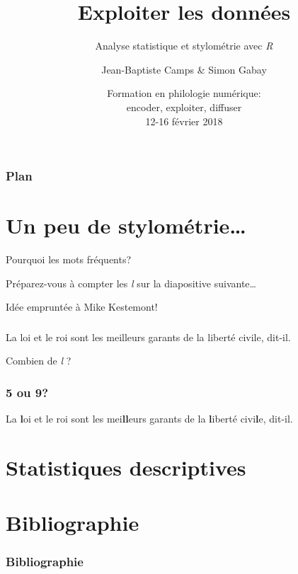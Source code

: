\documentclass{beamer}
\institute{Univ. de Neuchâtel}
\title{Exploiter les données}
\subtitle{Analyse statistique et stylométrie avec \textit{R}}
\author{Jean-Baptiste Camps \& Simon Gabay}
\date[FoPhil -- 15 févr. 2018]{Formation en philologie numérique:\\ encoder, exploiter, diffuser\\
12-16 février 2018}
\begin{document}
\maketitle
  




\begin{frame} 
  \frametitle{Plan} 
  \tableofcontents
\end{frame}

\section{Un peu de stylométrie…}



\begin{frame}{Pourquoi les mots fréquents?}

\huge

Préparez-vous à compter les \textit{l} sur la diapositive suivante…


{\normalsize Idée empruntée à Mike Kestemont!}

\end{frame}


\begin{frame}
\frametitle{}


\huge

\og{}La loi et le roi sont les meilleurs garants de la liberté civile\fg{}, dit-il.

\end{frame}

\begin{frame}{Combien de \textit{l} ?}





\end{frame}


\begin{frame}
\frametitle{5 ou 9?}

\huge

\og{}\alert{L}a \textbf{l}oi et \alert{l}e roi sont \alert{l}es mei\textbf{ll}eurs garants de \alert{l}a \textbf{l}iberté civi\textbf{l}e\fg{}, dit-i\alert{l}.

\end{frame}


\section{Statistiques descriptives}




\appendix

\section{Bibliographie}

\begin{frame}[fragile]
\frametitle{Bibliographie} 

\begin{thebibliography}{}
	\bibitem[]{} 
	
\end{thebibliography}


\end{frame}
\end{document}

